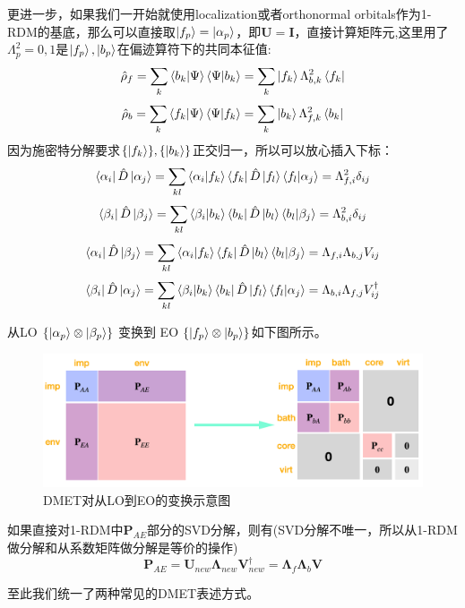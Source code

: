 更进一步，如果我们一开始就使用localization或者orthonormal orbitals作为1-RDM的基底，那么可以直接取$\ket{f_p}=\ket{\alpha_p}$，即$\mathbf{U}=\mathbf{I}$，直接计算矩阵元,这里用了$\Lambda_p^2=0,1$是$\ket{f_p},\ket{b_p}$在偏迹算符下的共同本征值:
\[\hat{\rho}_f=\sum_k\bra{b_k}\ket{\Psi}\bra{\Psi}\ket{b_k}=\sum_k\ket{f_k}\Lambda_{b,k}^2\bra{f_k}\]
\[\hat{\rho}_b=\sum_k\bra{f_k}\ket{\Psi}\bra{\Psi}\ket{f_k}=\sum_k\ket{b_k}\Lambda_{f,k}^2\bra{b_k}\]
因为施密特分解要求$\{\ket{f_k}\},\{\ket{b_k}\}$正交归一，所以可以放心插入下标：
\[\bra{\alpha_i}\hat{D}\ket{\alpha_j} = \sum_{kl}\bra{\alpha_i}\ket{f_k}\bra{f_k}\hat{D}\ket{f_l}\bra{f_l}\ket{\alpha_j} =\Lambda_{f,i}^2\delta_{ij}\]
\[\bra{\beta_i}\hat{D}\ket{\beta_j} = \sum_{kl}\bra{\beta_i}\ket{b_k}\bra{b_k}\hat{D}\ket{b_l}\bra{b_l}\ket{\beta_j} =\Lambda_{b,i}^2\delta_{ij}\]
\[\bra{\alpha_i}\hat{D}\ket{\beta_j} = \sum_{kl}\bra{\alpha_i}\ket{f_k}\bra{f_k}\hat{D}\ket{b_l}\bra{b_l}\ket{\beta_j} =\Lambda_{f,i}\Lambda_{b,j}V_{ij}\]
\[\bra{\beta_i}\hat{D}\ket{\alpha_j} = \sum_{kl}\bra{\beta_i}\ket{b_k}\bra{b_k}\hat{D}\ket{f_l}\bra{f_l}\ket{\alpha_j} =\Lambda_{b,i}\Lambda_{f,j}V^{\dagger}_{ij}\]

从LO $\{\ket{\alpha_p}\otimes\ket{\beta_p}\}$ 变换到 EO $\{\ket{f_p}\otimes\ket{b_p}\}$如下图所示。
\begin{figure}[htbp]
    \centering
    \includegraphics[scale=0.5]{./fig/et/dmet-hartree-fock-dm.png}
    \caption{DMET对从LO到EO的变换示意图}
\end{figure}

如果直接对1-RDM中$\mathbf{P}_{AE}$部分的SVD分解，则有(SVD分解不唯一，所以从1-RDM做分解和从系数矩阵做分解是等价的操作)
\[\mathbf{P}_{AE}=\mathbf{U}_{new}\mathbf{\Lambda}_{new}\mathbf{V}_{new}^{\dagger}=\mathbf{\Lambda}_f\mathbf{\Lambda}_b \mathbf{V}\]

至此我们统一了两种常见的DMET表述方式。